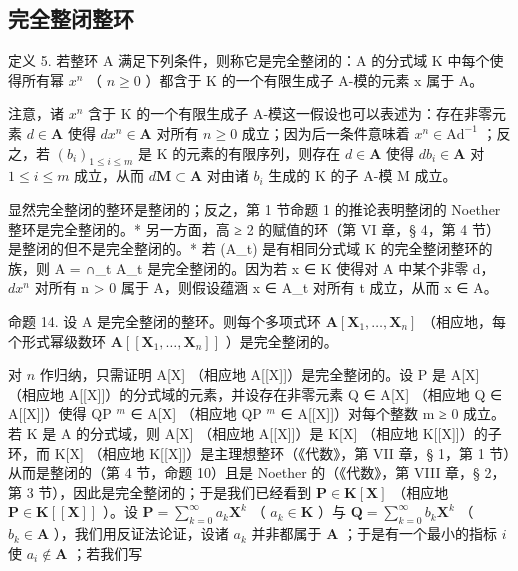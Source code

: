 \subsection{完全整闭整环}

定义 5. 若整环 A 满足下列条件，则称它是完全整闭的：A 的分式域 K 中每个使得所有幂 \(x^{n}\) （ \(n \geqslant 0\) ）都含于 K 的一个有限生成子 A-模的元素 x 属于 A。

注意，诸 \(x^n\) 含于 K 的一个有限生成子 A-模这一假设也可以表述为：存在非零元素 \(d \in \mathbf{A}\) 使得 \(dx^n \in \mathbf{A}\) 对所有 \(n \geqslant 0\) 成立；因为后一条件意味着 \(x^n \in \mathrm{Ad}^{-1}\) ；反之，若 \((b_i)_{1 \leqslant i \leqslant m}\) 是 K 的元素的有限序列，则存在 \(d \in \mathbf{A}\) 使得 \(db_i \in \mathbf{A}\) 对 \(1 \leqslant i \leqslant m\) 成立，从而 \(d\mathbf{M} \subset \mathbf{A}\) 对由诸 \(b_i\) 生成的 K 的子 A-模 M 成立。

显然完全整闭的整环是整闭的；反之，第 1 节命题 1 的推论表明整闭的 Noether 整环是完全整闭的。* 另一方面，高 ≥ 2 的赋值的环（第 VI 章，§ 4，第 4 节）是整闭的但不是完全整闭的。* 若 (A\_t) 是有相同分式域 K 的完全整闭整环的族，则 A = ∩\_t A\_t 是完全整闭的。因为若 x ∈ K 使得对 A 中某个非零 d，\(dx^n\) 对所有 n \textgreater{} 0 属于 A，则假设蕴涵 x ∈ A\_t 对所有 t 成立，从而 x ∈ A。

命题 14. 设 A 是完全整闭的整环。则每个多项式环 \(\mathbf{A}[\mathbf{X}_1,\ldots ,\mathbf{X}_n]\) （相应地，每个形式幂级数环 \(\mathbf{A}[[\mathbf{X}_1,\dots ,\mathbf{X}_n]]\) ）是完全整闭的。

对 \(n\) 作归纳，只需证明 A{[}X{]} （相应地 A{[}{[}X{]}{]}）是完全整闭的。设 P 是 A{[}X{]} （相应地 A{[}{[}X{]}{]}）的分式域的元素，并设存在非零元素 Q ∈ A{[}X{]} （相应地 Q ∈ A{[}{[}X{]}{]}）使得 QP \(^{m}\) ∈ A{[}X{]} （相应地 QP \(^{m}\) ∈ A{[}{[}X{]}{]}）对每个整数 m ≥ 0 成立。若 K 是 A 的分式域，则 A{[}X{]} （相应地 A{[}{[}X{]}{]}）是 K{[}X{]} （相应地 K{[}{[}X{]}{]}）的子环，而 K{[}X{]} （相应地 K{[}{[}X{]}{]}）是主理想整环（《代数》，第 VII 章，§ 1，第 1 节）从而是整闭的（第 4 节，命题 10）且是 Noether 的（《代数》，第 VIII 章，§ 2，第 3 节），因此是完全整闭的；于是我们已经看到 \(\mathbf{P} \in \mathbf{K}[\mathbf{X}]\) （相应地 \(\mathbf{P} \in \mathbf{K}[[\mathbf{X}]]\) ）。设 \(\mathbf{P} = \sum_{k=0}^{\infty} a_k \mathbf{X}^k\) （ \(a_k \in \mathbf{K}\) ）与 \(\mathbf{Q} = \sum_{k=0}^{\infty} b_k \mathbf{X}^k\) （ \(b_k \in \mathbf{A}\) ），我们用反证法论证，设诸 \(a_k\) 并非都属于 \(\mathbf{A}\) ；于是有一个最小的指标 \(i\) 使 \(a_i \notin \mathbf{A}\) ；若我们写

